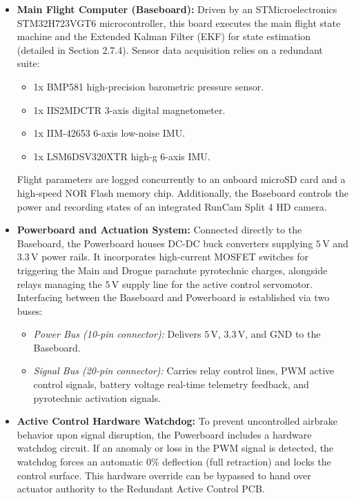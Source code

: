 \documentclass[11pt, a4paper]{article} %
\begin{document}
\begin{itemize}
    \item \textbf{Main Flight Computer (Baseboard):} Driven by an STMicroelectronics STM32H723VGT6 microcontroller, this board executes the main flight state machine and the Extended Kalman Filter (EKF) for state estimation (detailed in Section 2.7.4). Sensor data acquisition relies on a redundant suite:
    \begin{itemize}
        \item 1x BMP581 high-precision barometric pressure sensor.
        \item 1x IIS2MDCTR 3-axis digital magnetometer.
        \item 1x IIM-42653 6-axis low-noise IMU.
        \item 1x LSM6DSV320XTR high-g 6-axis IMU.
    \end{itemize}
    Flight parameters are logged concurrently to an onboard microSD card and a high-speed NOR Flash memory chip. Additionally, the Baseboard controls the power and recording states of an integrated RunCam Split 4 HD camera.

    \item \textbf{Powerboard and Actuation System:} Connected directly to the Baseboard, the Powerboard houses DC-DC buck converters supplying $5\,\text{V}$ and $3.3\,\text{V}$ power rails. It incorporates high-current MOSFET switches for triggering the Main and Drogue parachute pyrotechnic charges, alongside relays managing the $5\,\text{V}$ supply line for the active control servomotor. Interfacing between the Baseboard and Powerboard is established via two buses:
    \begin{itemize}
        \item \textit{Power Bus (10-pin connector):} Delivers $5\,\text{V}$, $3.3\,\text{V}$, and GND to the Baseboard.
        \item \textit{Signal Bus (20-pin connector):} Carries relay control lines, PWM active control signals, battery voltage real-time telemetry feedback, and pyrotechnic activation signals.
    \end{itemize}

    \item \textbf{Active Control Hardware Watchdog:} To prevent uncontrolled airbrake behavior upon signal disruption, the Powerboard includes a hardware watchdog circuit. If an anomaly or loss in the PWM signal is detected, the watchdog forces an automatic $0\%$ deflection (full retraction) and locks the control surface. This hardware override can be bypassed to hand over actuator authority to the Redundant Active Control PCB.


\end{itemize}
\end{document}
